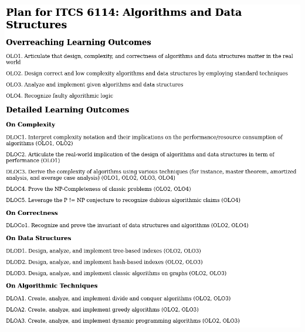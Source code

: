 \documentclass[aspectratio=169]{beamer}
\begin{document}
\begin{frame}
  \begin{columns}
    \includegraphics[width=\linewidth]{structure_figs/LOmap.png}
    

\end{columns}
\end{frame}
\end{document}
